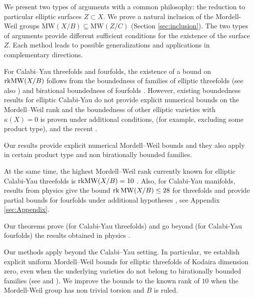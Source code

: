 \documentclass[11pt]{amsart}
\theoremstyle{definition}
\theoremstyle{definition}
\theoremstyle{remark}
\theoremstyle{remark}
\theoremstyle{definition}
\theoremstyle{conjecture}
\newcommand{\MW}{\mathrm{MW}}
\begin{document}
We present  two types of arguments with a common philosophy: the reduction to particular elliptic surfaces $Z \subset X$.   
We  prove a natural inclusion of the Mordell-Weil groups
$\MW(X/B) \subseteq \MW(Z/C)$
(Section \ref{sec:inclusion}). 
The two types of arguments provide different sufficient conditions  for the existence of  the surface $Z$. 
  Each method leads to possible generalizations  and applications in complementary directions.  
\color{black}



For Calabi–Yau threefolds and fourfolds, the existence of a bound on ${\rm rk}\MW(X/B)$  follows from the boundedness of families of elliptic threefolds \cite{Filipazzi:2021dcw} (see also \cite{Gross1994}) and birational boundedness of fourfolds \cite{engel2025boundednessfiberedktrivialvarieties}.  
 However, existing boundedness results for elliptic Calabi-Yau do not provide explicit numerical bounds on the Mordell–Weil rank and the  boundedness  of other elliptic varieties with $\kappa(X)=0$  is proven under additional conditions, (for example, excluding  some product type),  \cite{Birkar_2024, DiCerboSvaldi, Filipazzi:2021dcw, Gross1994} and the  recent \cite{FilipazziXu2026boundednessellipticcalabiyau4folds}. 
 


 Our  results  provide explicit numerical Mordell–Weil bounds and they also apply in certain product type and non birationally bounded families.



 
 At the same time, the highest Mordell–Weil rank currently known for elliptic Calabi-Yau threefolds is ${\rm rk}\MW(X/B) = 10$ 
 \cite{Grassi:2021wii,Elkies}. Also, for  Calabi-Yau manifolds, results from physics give the bound $\mathrm{rk}\,{\rm MW} (X/B)\le 28$ for threefolds and provide partial bounds for fourfolds under additional hypotheses \cite{Lee:2019skh,Martucci:2022krl,Lee:2022swr}, see Appendix \ref{sec:Appendix}.
 

 
Our theorems  prove (for Calabi-Yau threefolds)  and go beyond (for Calabi-Yau fourfolds) the  results obtained in  physics  \cite{Lee:2019skh,Martucci:2022krl,Lee:2022swr}.




Our methods apply beyond the Calabi–Yau setting. In particular, we establish explicit uniform Mordell–Weil bounds for elliptic threefolds of Kodaira dimension zero, even when the underlying varieties do not belong to birationally bounded families (see \cite{DiCerboSvaldi} and \cite{Birkar_2024}).
We improve the bounds to the known rank of $10$ when the Mordell-Weil group has non trivial torsion and $B$ is ruled.
\end{document}
